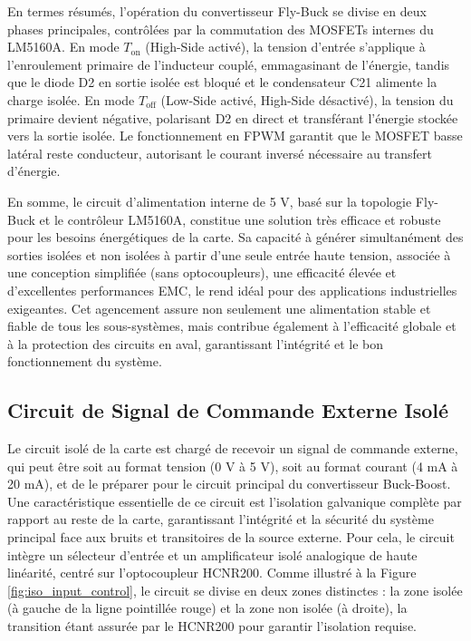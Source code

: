 En termes résumés, l'opération du convertisseur Fly-Buck se divise en deux phases principales, contrôlées par la commutation des MOSFETs internes du LM5160A. En mode \(T_{\text{on}}\) (High-Side activé), la tension d'entrée s'applique à l'enroulement primaire de l'inducteur couplé, emmagasinant de l'énergie, tandis que le diode D2 en sortie isolée est bloqué et le condensateur C21 alimente la charge isolée. En mode \(T_{\text{off}}\) (Low-Side activé, High-Side désactivé), la tension du primaire devient négative, polarisant D2 en direct et transférant l'énergie stockée vers la sortie isolée. Le fonctionnement en FPWM garantit que le MOSFET basse latéral reste conducteur, autorisant le courant inversé nécessaire au transfert d'énergie.

En somme, le circuit d'alimentation interne de 5 V, basé sur la topologie Fly-Buck et le contrôleur LM5160A, constitue une solution très efficace et robuste pour les besoins énergétiques de la carte. Sa capacité à générer simultanément des sorties isolées et non isolées à partir d'une seule entrée haute tension, associée à une conception simplifiée (sans optocoupleurs), une efficacité élevée et d'excellentes performances EMC, le rend idéal pour des applications industrielles exigeantes. Cet agencement assure non seulement une alimentation stable et fiable de tous les sous-systèmes, mais contribue également à l'efficacité globale et à la protection des circuits en aval, garantissant l'intégrité et le bon fonctionnement du système.






\subsection{Circuit de Signal de Commande Externe Isolé}

Le circuit isolé de la carte est chargé de recevoir un signal de commande externe, qui peut être soit au format tension (0 V à 5 V), soit au format courant (4 mA à 20 mA), et de le préparer pour le circuit principal du convertisseur Buck-Boost. Une caractéristique essentielle de ce circuit est l'isolation galvanique complète par rapport au reste de la carte, garantissant l'intégrité et la sécurité du système principal face aux bruits et transitoires de la source externe. Pour cela, le circuit intègre un sélecteur d'entrée et un amplificateur isolé analogique de haute linéarité, centré sur l'optocoupleur HCNR200. Comme illustré à la Figure \ref{fig:iso_input_control}, le circuit se divise en deux zones distinctes : la zone isolée (à gauche de la ligne pointillée rouge) et la zone non isolée (à droite), la transition étant assurée par le HCNR200 pour garantir l'isolation requise.

